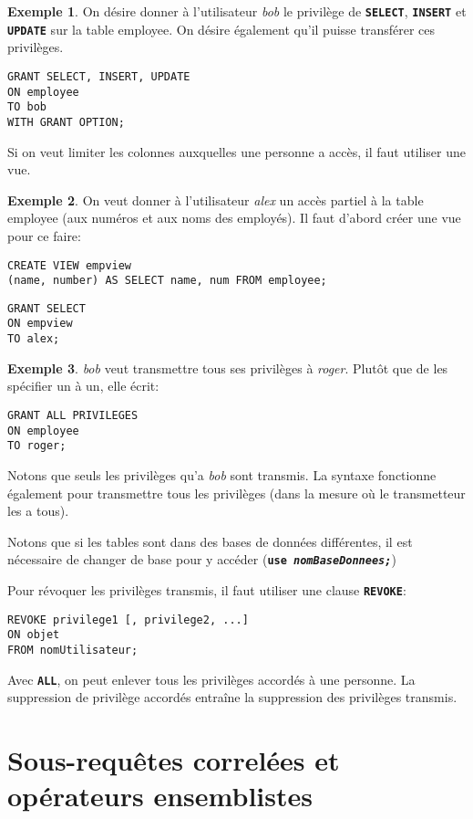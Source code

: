 \documentclass[a4paper, 12pt]{report}
\newcommand{\textSQL}[1]{\texttt{\textbf{#1}}}
\theoremstyle{definition} \newtheorem{ex}{Exemple}
\begin{document}
\begin{ex}
On désire donner à l'utilisateur \emph{bob} le privilège de \textSQL{SELECT}, \textSQL{INSERT} et \textSQL{UPDATE} sur la table employee. On désire également qu'il puisse transférer ces privilèges.
 \begin{lstlisting}[frame=single]
GRANT SELECT, INSERT, UPDATE 
ON employee
TO bob
WITH GRANT OPTION;
\end{lstlisting}
\end{ex}

Si on veut limiter les colonnes auxquelles une personne a accès, il faut utiliser une vue.
\begin{ex}
On veut donner à l'utilisateur \emph{alex} un accès partiel à la table employee (aux numéros et aux noms des employés). Il faut d'abord créer une vue pour ce faire:
\begin{lstlisting}[frame=single]
CREATE VIEW empview
(name, number) AS SELECT name, num FROM employee;
\end{lstlisting}
\begin{lstlisting}[frame=single]
GRANT SELECT
ON empview
TO alex;
\end{lstlisting}
\end{ex}

\begin{ex}
\emph{bob} veut transmettre tous ses privilèges à \emph{roger}. Plutôt que de les spécifier un à un, elle écrit:
\begin{lstlisting}[frame=single]
GRANT ALL PRIVILEGES
ON employee
TO roger;
\end{lstlisting}
Notons que seuls les privilèges qu'a \emph{bob} sont transmis. La syntaxe fonctionne également pour transmettre tous les privilèges (dans la mesure où le transmetteur les a tous).
\end{ex}

Notons que si les tables sont dans des bases de données différentes, il est nécessaire de changer de base pour y accéder (\textSQL{use \emph{nomBaseDonnees;}})

Pour révoquer les privilèges transmis, il faut utiliser une clause \textSQL{REVOKE}:
\begin{lstlisting}[frame=single]
REVOKE privilege1 [, privilege2, ...]
ON objet
FROM nomUtilisateur;
\end{lstlisting}
Avec \textSQL{ALL}, on peut enlever tous les privilèges accordés à une personne. La suppression de privilège accordés entraîne la suppression des privilèges transmis.

\chapter{Sous-requêtes correlées et opérateurs ensemblistes}
\end{document}
